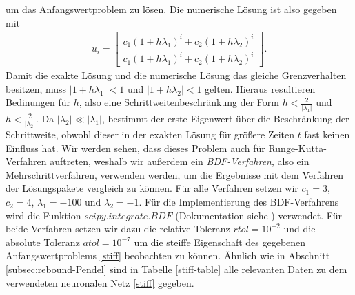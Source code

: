 um das Anfangswertproblem zu lösen. Die numerische Lösung ist also gegeben mit
\begin{align*}
       u_{i}=
       \begin{bmatrix}
              c_1 (1+h\lambda_1)^{i} + c_2 (1+h\lambda_2)^{i}\\
              c_1 (1+h\lambda_1)^{i} + c_2 (1+h\lambda_2)^{i}
       \end{bmatrix}.
\end{align*}
Damit die exakte Lösung und die numerische Lösung das gleiche Grenzverhalten besitzen, muss $|1 + h\lambda_1|<1$ und
$|1 + h\lambda_2|<1$ gelten. Hieraus resultieren Bedinungen für $h$, also eine Schrittweitenbeschränkung der Form
$h<\frac{2}{|\lambda_1|}$ und $h<\frac{2}{|\lambda_2|}$. Da $|\lambda_2| \ll |\lambda_1|$, bestimmt der erste Eigenwert
über die Beschränkung der Schrittweite, obwohl dieser in der exakten Lösung für größere Zeiten $t$ fast keinen Einfluss
hat. Wir werden sehen, dass dieses Problem auch für Runge-Kutta-Verfahren auftreten, weshalb wir außerdem ein
\textit{BDF-Verfahren}, also ein Mehrschrittverfahren, verwenden werden, um die Ergebnisse mit dem Verfahren der
Lösungspakete vergleich zu können. Für alle Verfahren setzen wir $c_1=3$, $c_2=4$, $\lambda_1 = -100$ und $\lambda_2=-1$.
Für die Implementierung des BDF-Verfahrens wird die Funktion $scipy.integrate.BDF$ (Dokumentation siehe
\cite{ScipyIntegrateBDF}) verwendet. Für beide Verfahren setzen wir dazu die relative Toleranz $rtol=10^{-2}$ und die
absolute Toleranz $atol=10^{-7}$ um die steiffe Eigenschaft des gegebenen Anfangswertproblems \eqref{stiff} beobachten
zu können. Ähnlich wie in Abschnitt \ref{subsec:rebound-Pendel} sind in Tabelle \ref{stiff-table} alle relevanten Daten
zu dem verwendeten neuronalen Netz \eqref{stiff} gegeben.

